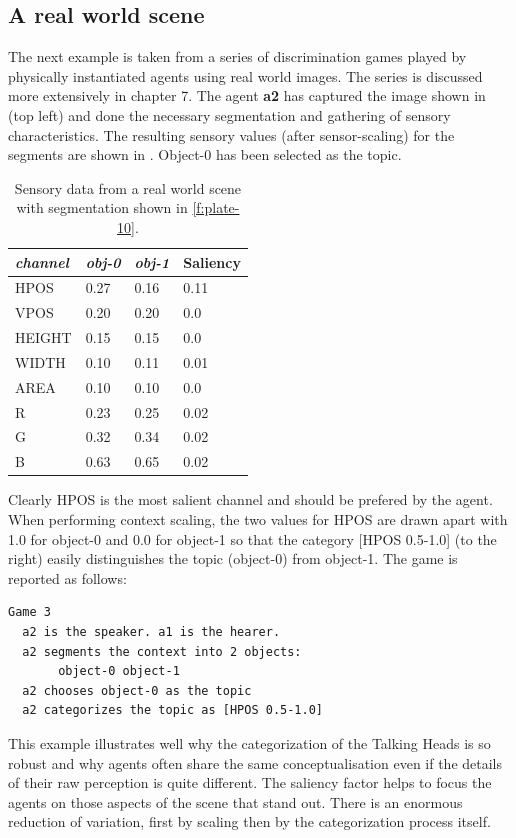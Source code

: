 \subsection{A real world scene}

The next example is taken from a series of discrimination 
games played by physically instantiated agents using 
real world images. The series is discussed more extensively 
in chapter 7. The agent {\bf a2} has 
captured the image shown in 
(top left) and done the necessary segmentation and 
gathering of sensory characteristics. The resulting sensory
values (after sensor-scaling) for the segments are shown
in . Object-0 has been selected as the topic. 
\begin{table}
\begin{center}
\begin{tabular}{ l  l  l  l } \hline
{\it channel}& {\it obj-0} & {\it obj-1} & Saliency\\ \hline
HPOS & 0.27 & 0.16 & 0.11\\ \hline
VPOS & 0.20 & 0.20 & 0.0\\ \hline
HEIGHT & 0.15 & 0.15 & 0.0\\ \hline
WIDTH & 0.10 & 0.11 & 0.01\\ \hline
AREA & 0.10 & 0.10 & 0.0\\ \hline
R & 0.23 & 0.25 & 0.02\\ \hline
G & 0.32 & 0.34  & 0.02\\ \hline
B & 0.63 & 0.65 & 0.02\\ \hline
\end{tabular}
\caption{\label{tab:t-real} Sensory data from a real world scene with segmentation shown in \ref{f:plate-10}.}
\end{center}
\end{table}
Clearly HPOS is the most salient channel and should be 
prefered by the agent. When performing context scaling, 
the two values for HPOS are drawn apart with 1.0 for object-0 and 
0.0 for object-1 so that the category [HPOS 0.5-1.0] (to the 
right) easily distinguishes the topic (object-0) from
object-1. The game is reported as follows: 
\begin{verbatim}
Game 3 
  a2 is the speaker. a1 is the hearer. 
  a2 segments the context into 2 objects: 
       object-0 object-1
  a2 chooses object-0 as the topic 
  a2 categorizes the topic as [HPOS 0.5-1.0]
\end{verbatim}
This example illustrates well why the categorization 
of the Talking Heads is so robust and why agents 
often share the same conceptualisation even if the details  
of their raw perception is quite different. 
The saliency factor helps to focus the agents on those
aspects of the scene that stand out. There is 
an enormous reduction of variation, first by scaling then by 
the categorization process itself. 

